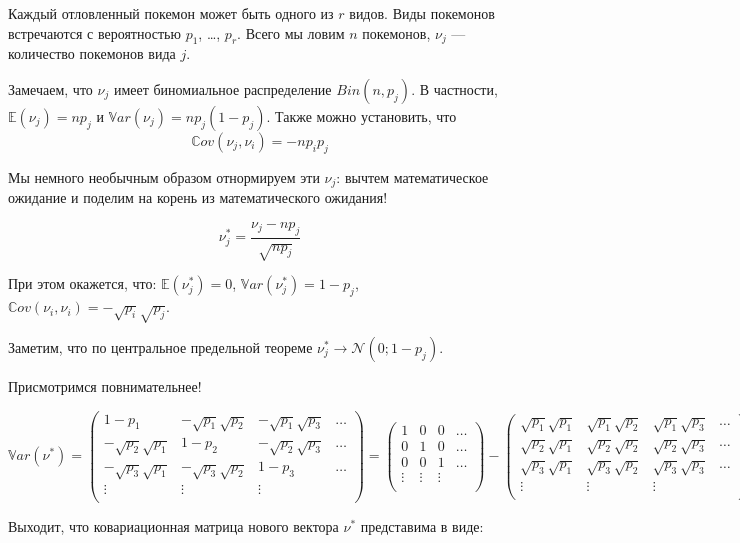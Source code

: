 \documentclass[11pt,russian,]{article}
\newcommand{\cN}{\mathcal{N}}
\newcommand{\E}{\mathbb{E}}
\newcommand{\1}{\mathbbm{1}}
\newcommand{\Var}{\mathbb{V}ar}
\newcommand{\Cov}{\mathbb{C}ov}
\begin{document}
Каждый отловленный покемон может быть одного из \(r\) видов. Виды
покемонов встречаются с вероятностью \(p_1\), \ldots, \(p_{r}\). Всего
мы ловим \(n\) покемонов, \(\nu_j\) --- количество покемонов вида \(j\).

Замечаем, что \(\nu_j\) имеет биномиальное распределение
\(Bin(n, p_j)\). В частности, \(\E(\nu_j) = np_j\) и
\(\Var(\nu_j)=n p_j (1- p_j)\). Также можно установить, что \[
\Cov(\nu_j, \nu_i) = -np_ip_j
\]

Мы немного необычным образом отнормируем эти \(\nu_j\): вычтем
математическое ожидание и поделим на корень из математического ожидания!

\[
\nu_j^* = \frac{\nu_j - np_j}{\sqrt{np_j}}
\]

При этом окажется, что: \(\E(\nu_j^*) = 0\),
\(\Var(\nu_j^*) = 1 - p_j\),
\(\Cov(\nu_i, \nu_i) = - \sqrt{p_i}\sqrt{p_j}\).

Заметим, что по центральное предельной теореме
\(\nu_j^* \to \cN(0; 1 - p_j)\).

Присмотримся повнимательнее!

\[
\Var(\nu^*) = \begin{pmatrix}
1 - p_1 & -\sqrt{p_1}\sqrt{p_2} & -\sqrt{p_1}\sqrt{p_3} & \ldots \\
-\sqrt{p_2}\sqrt{p_1} & 1 - p_2 & -\sqrt{p_2}\sqrt{p_3} & \ldots \\
-\sqrt{p_3}\sqrt{p_1} & -\sqrt{p_3}\sqrt{p_2} & 1 - p_3  & \ldots \\
\vdots & \vdots & \vdots &  \\
\end{pmatrix} = 
\begin{pmatrix}
1 & 0 & 0 & \ldots \\
0 & 1 & 0 & \ldots \\
0 & 0 & 1 & \ldots \\
\vdots & \vdots & \vdots &  \\
\end{pmatrix} - \begin{pmatrix}
\sqrt{p_1}\sqrt{p_1} & \sqrt{p_1}\sqrt{p_2} & \sqrt{p_1}\sqrt{p_3} & \ldots \\
\sqrt{p_2}\sqrt{p_1} & \sqrt{p_2}\sqrt{p_2} & \sqrt{p_2}\sqrt{p_3} & \ldots \\
\sqrt{p_3}\sqrt{p_1} & \sqrt{p_3}\sqrt{p_2} & \sqrt{p_3}\sqrt{p_3}  & \ldots \\
\vdots & \vdots & \vdots &  \\
\end{pmatrix}
\]

Выходит, что ковариационная матрица нового вектора \(\nu^*\) представима
в виде:
\end{document}
